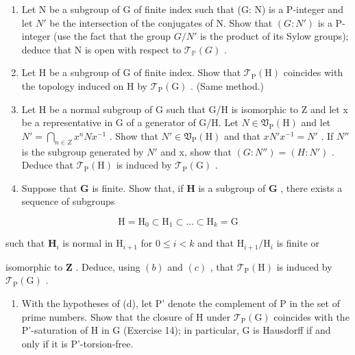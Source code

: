 \begin{enumerate}
\def\labelenumi{(\alph{enumi})}
\item
  Let N be a subgroup of G of finite index such that (G: N) is a P-integer and let \(N'\) be the intersection of the conjugates of N. Show that \((G: N')\) is a P-integer (use the fact that the group \(G/N'\) is the product of its Sylow groups); deduce that N is open with respect to \(\mathcal{T}_{\mathbb{P}}(G)\) .
\item
  Let H be a subgroup of G of finite index. Show that \(\mathcal{T}_{\mathrm{P}}(\mathrm{H})\) coincides with the topology induced on H by \(\mathcal{T}_{\mathrm{P}}(\mathrm{G})\) . (Same method.)
\item
  Let H be a normal subgroup of G such that G/H is isomorphic to Z and let x be a representative in G of a generator of G/H. Let \(N \in \mathfrak{V}_{\mathrm{P}}(\mathrm{H})\) and let \(N' = \bigcap_{n \in Z} x^{n} N x^{-1}\) . Show that \(N' \in \mathfrak{V}_{\mathrm{P}}(\mathrm{H})\) and that \(x N' x^{-1} = N'\) . If \(N''\) is the subgroup generated by \(N'\) and x, show that \((G: N'') = (H: N')\) . Deduce that \(\mathcal{T}_{\mathrm{P}}(\mathrm{H})\) is induced by \(\mathcal{T}_{\mathrm{P}}(\mathrm{G})\) .
\item
  Suppose that \(\mathbf{G}\) is finite. Show that, if \(\mathbf{H}\) is a subgroup of \(\mathbf{G}\) , there exists a sequence of subgroups
\end{enumerate}

\[
\mathrm{H} = \mathrm{H} _ {0} \subset \mathrm{H} _ {1} \subset \dots \subset \mathrm{H} _ {k} = \mathrm{G}
\]

such that \(\mathbf{H}_i\) is normal in \(\mathrm{H}_{i + 1}\) for \(0\leqslant i < k\) and that \(\mathrm{H}_{i + 1} / \mathrm{H}_i\) is finite or

isomorphic to \(\mathbf{Z}\) . Deduce, using \((b)\) and \((c)\) , that \(\mathcal{T}_{\mathrm{P}}(\mathrm{H})\) is induced by \(\mathcal{T}_{\mathrm{P}}(\mathrm{G})\) .

\begin{enumerate}
\def\labelenumi{(\alph{enumi})}
\setcounter{enumi}{4}
\tightlist
\item
  With the hypotheses of (d), let P' denote the complement of P in the set of prime numbers. Show that the closure of H under \(\mathcal{T}_{\mathrm{P}}(\mathrm{G})\) coincides with the P'-saturation of H in G (Exercise 14); in particular, G is Hausdorff if and only if it is P'-torsion-free.
\end{enumerate}

